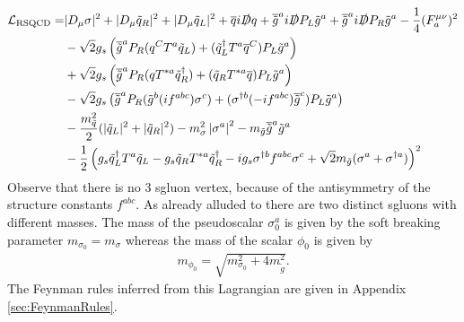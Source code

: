 \begin{align}
\mathcal{L}_{\mathrm{RSQCD}} = & |D_\mu \sigma|^2 + |D_\mu \tilde{q}_R|^2 + |D_\mu \tilde{q}_L|^2 + \overline{q}i\slashed{D}q + \overline{\tilde{g}}^ai\slashed{D}P_L\tilde{g}^a + \overline{\tilde{g}}^ai\slashed{D}P_R\tilde{g}^a - \frac{1}{4} (F_a^{\mu\nu})^2\nonumber\\
& -\sqrt{2}g_s \left( \overline{\tilde{g}}^a P_R (q^C T^a \tilde{q}_L) + (\tilde{q}_L^\dagger T^a \overline{q}^C)P_L\tilde{g}^a \right)\nonumber\\
& +\sqrt{2}g_s \left( \overline{\tilde{g}}^a P_R (q T^{\ast a} \tilde{q}_R^\dagger) + (\tilde{q}_R T^{\ast a} \overline{q})P_L\tilde{g}^a \right) \nonumber\\
& -\sqrt{2}g_s \left( \overline{\tilde{g}}^a P_R (\tilde{g}^b (if^{abc}) \sigma^c) + (\sigma^{\dagger b} (-if^{abc}) \overline{\tilde{g}}^c)P_L\tilde{g}^a \right) \nonumber\\
& -\frac{m_{\tilde{q}}^2}{2}(|\tilde{q}_L|^2 + |\tilde{q}_R|^2) -m_{\sigma}^2\left|\sigma^a\right|^2  - m_{\tilde{g}} \overline{\tilde{g}}^a\tilde{g}^a\nonumber\\
& -\frac{1}{2}\left( g_s \tilde{q}_L^\dagger T^a \tilde{q}_L - g_s \tilde{q}_R T^{\ast a} \tilde{q}_R^\dagger - ig_s\sigma^{\dagger b}f^{abc}\sigma^c + \sqrt{2}m_{\tilde{g}}(\sigma^a + \sigma^{\dagger a}) \right)^2\label{eq:L_RSQCD}
\end{align}
Observe that there is no 3 sgluon vertex, because of the antisymmetry of the structure constants $f^{abc}$. As already alluded to there are two distinct sgluons with different masses. The mass of the pseudoscalar $\sigma_0^a$ is given by the soft breaking parameter $m_{\sigma_0} = m_\sigma$ whereas the mass of the scalar $\phi_0$ is given by 
\begin{align}
m_{\phi_0} = \sqrt{m_{\sigma_0}^2 + 4 m_{\tilde{g}}^2}.
\end{align}
The Feynman rules inferred from this Lagrangian are given in Appendix \ref{sec:FeynmanRules}.
\newpage
